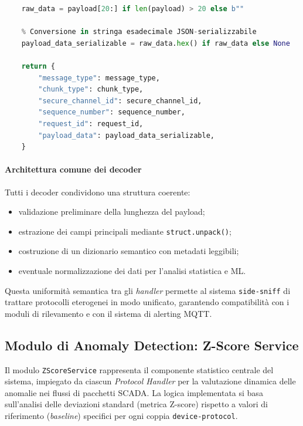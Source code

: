 \begin{enumerate}
\begin{lstlisting}[language=Python, caption={Funzione Parsing OPC-UA Payload}, label={lst:parisng_opcua_function}]
    % Payload dati veri e propri
    raw_data = payload[20:] if len(payload) > 20 else b""

    % Conversione in stringa esadecimale JSON-serializzabile
    payload_data_serializable = raw_data.hex() if raw_data else None

    return {
        "message_type": message_type,
        "chunk_type": chunk_type,
        "secure_channel_id": secure_channel_id,
        "sequence_number": sequence_number,
        "request_id": request_id,
        "payload_data": payload_data_serializable,
    }
\end{lstlisting}




\paragraph{Architettura comune dei decoder}
Tutti i decoder condividono una struttura coerente:
\begin{itemize}
  \item validazione preliminare della lunghezza del payload;
  \item estrazione dei campi principali mediante \texttt{struct.unpack()};
  \item costruzione di un dizionario semantico con metadati leggibili;
  \item eventuale normalizzazione dei dati per l’analisi statistica e ML.
\end{itemize}

Questa uniformità semantica tra gli \textit{handler} permette al sistema \texttt{side-sniff} di trattare protocolli eterogenei in modo unificato, garantendo compatibilità con i moduli di rilevamento e con il sistema di alerting MQTT.

\subsection{Modulo di Anomaly Detection: Z-Score Service}
\label{subsec:zscore-service}

Il modulo \texttt{ZScoreService} rappresenta il componente statistico centrale del sistema, impiegato da ciascun \textit{Protocol Handler} per la valutazione dinamica delle anomalie nei flussi di pacchetti SCADA.  
La logica implementata si basa sull'analisi delle deviazioni standard (metrica Z-score) rispetto a valori di riferimento (\textit{baseline}) specifici per ogni coppia \texttt{device-protocol}.  


\end{enumerate}
